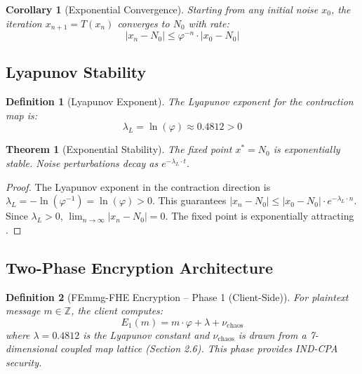 \documentclass{article}
\newtheorem{theorem}{Theorem}[section]
\newtheorem{definition}{Definition}[section]
\newtheorem{corollary}{Corollary}[theorem]
\begin{document}
\begin{corollary}[Exponential Convergence]
Starting from any initial noise $x_0$, the iteration $x_{n+1} = T(x_n)$ converges to $N_0$ with rate:
\begin{equation}
|x_n - N_0| \leq \varphi^{-n} \cdot |x_0 - N_0|
\end{equation}
\end{corollary}

\subsection{Lyapunov Stability}

\begin{definition}[Lyapunov Exponent]
The Lyapunov exponent for the contraction map is:
\begin{equation}
\lambda_L = \ln(\varphi) \approx 0.4812 > 0
\end{equation}
\end{definition}

\begin{theorem}[Exponential Stability]
The fixed point $x^* = N_0$ is exponentially stable. Noise perturbations decay as $e^{-\lambda_L \cdot t}$.
\end{theorem}

\begin{proof}
The Lyapunov exponent in the contraction direction is $\lambda_L = -\ln(\varphi^{-1}) = \ln(\varphi) > 0$. This guarantees $|x_n - N_0| \leq |x_0 - N_0| \cdot e^{-\lambda_L \cdot n}$. Since $\lambda_L > 0$, $\lim_{n \to \infty} |x_n - N_0| = 0$. The fixed point is exponentially attracting \cite{lyapunov1892}.
\end{proof}

\subsection{Two-Phase Encryption Architecture}

\begin{definition}[FEmmg-FHE Encryption -- Phase 1 (Client-Side)]
For plaintext message $m \in \mathbb{Z}$, the client computes:
\begin{equation}
E_1(m) = m \cdot \varphi + \lambda + \nu_{\text{chaos}}
\end{equation}
where $\lambda = 0.4812$ is the Lyapunov constant and $\nu_{\text{chaos}}$ is drawn from a 7-dimensional coupled map lattice (Section 2.6). This phase provides IND-CPA security.
\end{definition}
\end{document}
